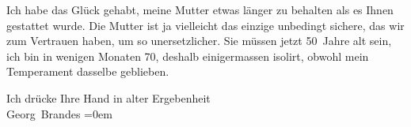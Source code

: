 \pstart
           Ich habe das Glück gehabt, meine Mutter etwas länger zu behalten als es Ihnen gestattet wurde. Die Mutter ist
               ja vielleicht das einzige unbedingt sichere, das wir zum Vertrauen haben, um so
               unersetzlicher. Sie müssen jetzt 50 Jahre alt sein, ich bin in wenigen Monaten 70,
               deshalb einigermassen isolirt, obwohl mein Temperament dasselbe geblieben.\pend
           
\pstart
           Ich drücke Ihre Hand in alter Ergebenheit{\\[\baselineskip]}\spacefill\mbox{Georg Brandes}\pend
           \leftskip=0em{}\endnumbering{}  
      